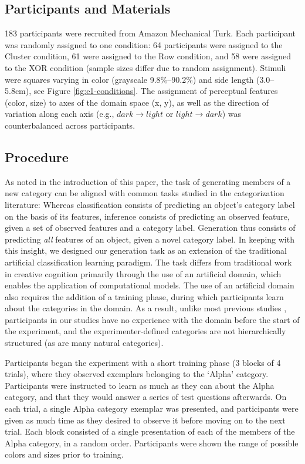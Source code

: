 \documentclass[12pt]{article}
\begin{document}
\begin{flushleft}
\subsection{Participants and Materials}

183 participants were recruited from Amazon Mechanical Turk. Each participant
was randomly assigned to one condition: 64 participants were assigned to the
Cluster condition, 61 were assigned to the Row condition, and 58 were assigned
to the XOR condition (sample sizes differ due to random assignment). Stimuli
were squares varying in color (grayscale 9.8\%--90.2\%) and side length
(3.0--5.8cm), see Figure \ref{fig:e1-conditions}. The assignment of perceptual
features (color, size) to axes of the domain space (x, y), as well as the
direction of variation along each axis (e.g., $dark \rightarrow light$ or $light
\rightarrow dark$) was counterbalanced across participants.

\subsection{Procedure}

As noted in the introduction of this paper, the task of generating members of a
new category can be aligned with common tasks studied in the categorization
literature: Whereas classification consists of predicting an object's category
label on the basis of its features, inference consists of predicting an observed
feature, given a set of observed features and a category label. Generation thus
consists of predicting {\em all} features of an object, given a novel category
label. In keeping with this insight, we designed our generation task as an
extension of the traditional artificial classification learning paradigm. The
task differs from traditional work in creative cognition primarily through the
use of an artificial domain, which enables the application of computational
models. The use of an artificial domain also requires the addition of a training
phase, during which participants learn about the categories in the domain. As a
result, unlike most previous studies \citep[e.g.,][]{ward1994structured},
participants in our studies have no experience with the domain before the start
of the experiment, and the experimenter-defined categories are not
hierarchically structured (as are many natural categories).

Participants began the experiment with a short training phase (3 blocks of 4
trials), where they observed exemplars belonging to the `Alpha' category.
Participants were instructed to learn as much as they can about the Alpha
category, and that they would answer a series of test questions afterwards. On
each trial, a single Alpha category exemplar was presented, and participants
were given as much time as they desired to observe it before moving on to the
next trial. Each block consisted of a single presentation of each of the members
of the Alpha category, in a random order. Participants were shown the range of
possible colors and sizes prior to training.


\end{flushleft}
\end{document}
